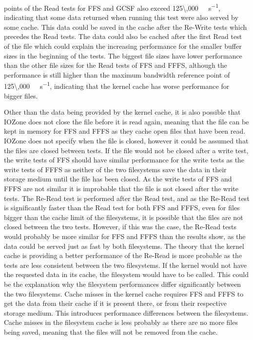 points of the Read tests for \gls{FFS} and \gls{GCSF} also exceed \SI[per-mode = symbol]{125\,000}{\kilo\byte\per\second}, indicating that some data returned when running this test were also served by some cache. This data could be saved in the cache after the \mbox{Re-Write} tests which precedes the Read tests. The data could also be cached after the first Read test of the file which could explain the increasing performance for the smaller buffer sizes in the beginning of the tests. The biggest file sizes have lower performance than the other file sizes for the Read tests of \gls{FFS} and \gls{FFFS}, although the performance is still higher than the maximum bandwidth reference point of \SI[per-mode = symbol]{125\,000}{\kilo\byte\per\second}, indicating that the kernel cache has worse performance for bigger files.

Other than the data being provided by the kernel cache, it is also possible that IOZone does not close the file before it is read again, meaning that the file can be kept in memory for \gls{FFS} and \gls{FFFS} as they cache open files that have been read. IOZone does not specify when the file is closed, however it could be assumed that the files are closed between tests. If the file would not be closed after a write test, the write tests of \gls{FFS} should have similar performance for the write tests as the write tests of \gls{FFFS} as neither of the two filesystems save the data in their storage medium until the file has been closed. As the write tests of \gls{FFS} and \gls{FFFS} are not similar it is improbable that the file is not closed after the write tests. The \mbox{Re-Read} test is performed after the Read test, and as the \mbox{Re-Read} test is significantly faster than the Read test for both \mbox{FFS} and \gls{FFFS}, even for files bigger than the cache limit of the filesystems, it is possible that the files are not closed between the two tests. However, if this was the case, the \mbox{Re-Read} tests would probably be more similar for \gls{FFS} and \gls{FFFS} than the results show, as the data could be served just as fast by both filesystems. The theory that the kernel cache is providing a better performance of the \mbox{Re-Read} is more probable as the tests are less consistent between the two filesystems. If the kernel would not have the requested data in its cache, the filesystem would have to be called. This could be the explanation why the filesystem performances differ significantly between the two filesystems. Cache misses in the kernel cache requires \gls{FFS} and \gls{FFFS} to get the data from their cache if it is present there, or from their respective storage medium. This introduces performance differences between the filesystems. Cache misses in the filesystem cache is less probably as there are no more files being saved, meaning that the files will not be removed from the cache.

